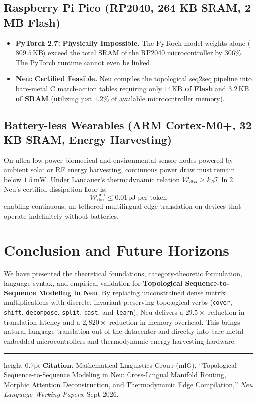 \documentclass[11pt]{article}
\begin{document}
\subsection{Raspberry Pi Pico (RP2040, 264 KB SRAM, 2 MB Flash)}
\begin{itemize}
    \item \textbf{PyTorch 2.7:} \textbf{Physically Impossible.} The PyTorch model weights alone ($809.5\,\text{KB}$) exceed the total SRAM of the RP2040 microcontroller by $306\%$. The PyTorch runtime cannot even be linked.
    \item \textbf{Neu:} \textbf{Certified Feasible.} Neu compiles the topological seq2seq pipeline into bare-metal C match-action tables requiring only \textbf{$14\,\text{KB}$ of Flash} and \textbf{$3.2\,\text{KB}$ of SRAM} (utilizing just $1.2\%$ of available microcontroller memory).
\end{itemize}

\subsection{Battery-less Wearables (ARM Cortex-M0+, 32 KB SRAM, Energy Harvesting)}
On ultra-low-power biomedical and environmental sensor nodes powered by ambient solar or RF energy harvesting, continuous power draw must remain below $1.5\,\text{mW}$. Under Landauer's thermodynamic relation $\mathcal{W}_{\text{diss}} \ge k_B \mathcal{T} \ln 2$, Neu's certified dissipation floor is:
\begin{equation}
\mathcal{W}_{\text{diss}}^{\text{neu}} \le 0.01\,\text{pJ per token}
\end{equation}
enabling continuous, un-tethered multilingual edge translation on devices that operate indefinitely without batteries.

\section{Conclusion and Future Horizons}

We have presented the theoretical foundations, category-theoretic formulation, language syntax, and empirical validation for \textbf{Topological Sequence-to-Sequence Modeling in Neu}. By replacing unconstrained dense matrix multiplications with discrete, invariant-preserving topological verbs (\texttt{cover}, \texttt{shift}, \texttt{decompose}, \texttt{split}, \texttt{cast}, and \texttt{learn}), Neu delivers a $29.5\times$ reduction in translation latency and a $2,820\times$ reduction in memory overhead. This brings natural language translation out of the datacenter and directly into bare-metal embedded microcontrollers and thermodynamic energy-harvesting hardware.

\vspace{0.6em}
\noindent\hrule height 0.7pt \vspace{0.4em}
{\scriptsize\sffamily\color{commentcolor}
\textbf{Citation:} Mathematical Linguistics Group (mlG), ``Topological Sequence-to-Sequence Modeling in Neu: Cross-Lingual Manifold Routing, Morphic Attention Deconstruction, and Thermodynamic Edge Compilation,'' \textit{Neu Language Working Papers}, Sept 2026.
}
\end{document}
